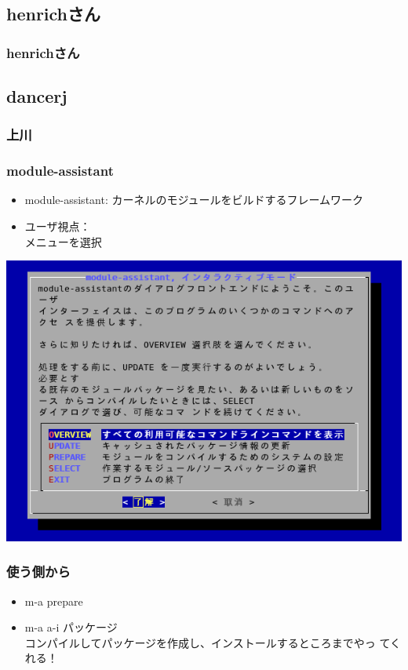 \documentclass[cjk,dvipdfmx]{beamer}
\begin{document}
\subsection{henrichさん}
\begin{frame}
 \frametitle{henrichさん}
\end{frame}
\subsection{dancerj}
\begin{frame}
 \frametitle{上川}
\end{frame}

\begin{frame}
 \frametitle{module-assistant}
\begin{minipage}[b]{0.35\hsize}
  \begin{itemize}
  \item module-assistant: カーネルのモジュールをビルドするフレームワーク
  \item ユーザ視点： \\メニューを選択
 \end{itemize}
\end{minipage}
\begin{minipage}[b]{0.6\hsize}
\includegraphics[width=1\hsize]{image200608/m-a.png}
\end{minipage}
\end{frame}

\begin{frame}
 \frametitle{使う側から}
 \begin{itemize}
  \item m-a prepare 
  \item m-a a-i パッケージ\\
	コンパイルしてパッケージを作成し、インストールするところまでやっ
	てくれる！
 \end{itemize}
\end{frame}
\end{document}
